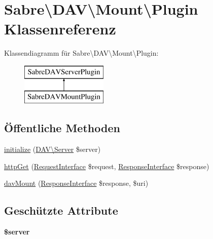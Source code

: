\hypertarget{class_sabre_1_1_d_a_v_1_1_mount_1_1_plugin}{}\section{Sabre\textbackslash{}D\+AV\textbackslash{}Mount\textbackslash{}Plugin Klassenreferenz}
\label{class_sabre_1_1_d_a_v_1_1_mount_1_1_plugin}
Klassendiagramm für Sabre\textbackslash{}D\+AV\textbackslash{}Mount\textbackslash{}Plugin\+:\begin{figure}[H]
\begin{center}
\leavevmode
\includegraphics[height=2.000000cm]{class_sabre_1_1_d_a_v_1_1_mount_1_1_plugin}
\end{center}
\end{figure}
\subsection*{Öffentliche Methoden}
\begin{DoxyCompactItemize}
\item 
\mbox{\hyperlink{class_sabre_1_1_d_a_v_1_1_mount_1_1_plugin_a7ddc2563e92fdbb763da7fbbaf250f6c}{initialize}} (\mbox{\hyperlink{class_sabre_1_1_d_a_v_1_1_server}{D\+A\+V\textbackslash{}\+Server}} \$server)
\item 
\mbox{\hyperlink{class_sabre_1_1_d_a_v_1_1_mount_1_1_plugin_aa6ebbdbaea16e2d4d78e855ec7c18af3}{http\+Get}} (\mbox{\hyperlink{interface_sabre_1_1_h_t_t_p_1_1_request_interface}{Request\+Interface}} \$request, \mbox{\hyperlink{interface_sabre_1_1_h_t_t_p_1_1_response_interface}{Response\+Interface}} \$response)
\item 
\mbox{\hyperlink{class_sabre_1_1_d_a_v_1_1_mount_1_1_plugin_aa6c2281e553a847b3201275327e0541a}{dav\+Mount}} (\mbox{\hyperlink{interface_sabre_1_1_h_t_t_p_1_1_response_interface}{Response\+Interface}} \$response, \$uri)
\end{DoxyCompactItemize}
\subsection*{Geschützte Attribute}
\begin{DoxyCompactItemize}
\item 
\mbox{\label{class_sabre_1_1_d_a_v_1_1_mount_1_1_plugin_a12c022b32e469c375d7ba7d7724fa2f4}} 
{\bfseries \$server}
\end{DoxyCompactItemize}


